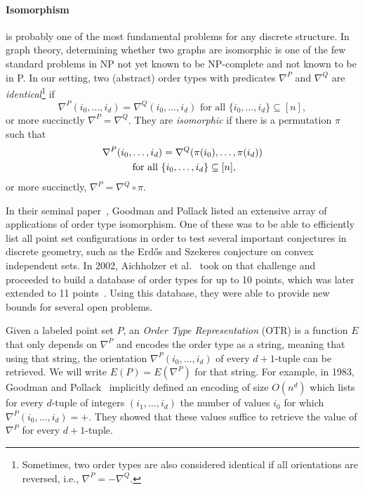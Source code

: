 \documentclass[leqno,12pt]{article}
\begin{document}
\paragraph{Isomorphism}
is probably one of the most fundamental problems for any
discrete structure. In graph theory,
determining whether two graphs are isomorphic is one of the few
standard problems in NP not yet known to be NP-complete and not known
to be in P.
In our setting, two (abstract) order types with predicates $\nabla^P$
and $\nabla^Q$ are \emph{identical}\footnote{Sometimes, two order types are
  also considered identical if all orientations are reversed, i.e.,
  $\nabla^P=-\nabla^Q$.} 
if 
$$\nabla^P(i_0,\ldots,i_d) = \nabla^Q(i_0,\ldots,i_d)
\text{ for all }\{i_0,\ldots,i_d\}\subseteq [n],$$
or more succinctly $\nabla^P=\nabla^Q$.
They are \emph{isomorphic} if there is a permutation $\pi$ such
that 
\begin{multline*}
\nabla^P(i_0,\ldots,i_d) = \nabla^Q(\pi(i_0),\ldots,\pi(i_d))\\
\text{ for all }\{i_0,\ldots,i_d\}\subseteq [n],$$ 
\end{multline*}
or more succinctly, $\nabla^P=\nabla^Q\circ\pi$.

In their seminal paper~\cite{goodman_pollack_83_sorting}, Goodman and Pollack listed an extensive array
of applications of order type isomorphism.  One of these was to be able
to efficiently list all point set configurations in order to test 
several important conjectures in discrete geometry, such as the Erd\H{o}s
and Szekeres conjecture on convex independent sets. In 2002,
Aichholzer et al.~\cite{aichholzer_etal_02} took on that challenge and
proceeded to build a database of  order types for up to 10 points,
which was later extended to 11
points~\cite{aichholzer_krasser_05_abstract_order_type}. Using this
database, they were able to provide new bounds for several open
problems.

Given a labeled point set $P$, an \emph{Order Type Representation} (OTR) is
a function $E$ that only depends on $\nabla^P$ and  encodes the
order type as a string, meaning that using that string, the orientation 
$\nabla^P(i_0,\ldots,i_d)$ of every $d{+}1$-tuple can be retrieved.
We will write $E(P) = E(\nabla^P)$ for that string.
For example, in 1983, Goodman and Pollack~\cite{goodman_pollack_83_sorting} implicitly defined an
encoding of size $O(n^d)$ which lists for every $d$-tuple of integers
$(i_1,\ldots,i_d)$ the number of values $i_0$ for which 
$\nabla^P(i_0,\ldots,i_d)=+$. They showed that  these values suffice to retrieve
the value of $\nabla^P$ for every $d{+}1$-tuple. 
\end{document}
